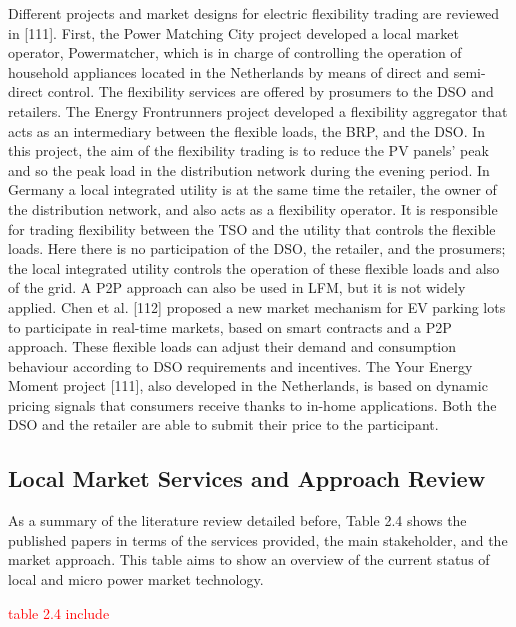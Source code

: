 Different projects and market designs for electric flexibility trading are reviewed in [111]. First, the Power Matching City project developed a local market operator, Powermatcher, which is in charge of controlling the operation of household appliances located in the Netherlands by means of direct and semi-direct control. 
The flexibility services are offered by prosumers to the DSO and retailers. The Energy Frontrunners project developed a flexibility aggregator that acts as an intermediary between the flexible loads, the BRP, and the DSO. In this project, the aim of the flexibility trading is to reduce the PV panels' peak and so the peak load in the distribution network during the evening period. In Germany a local integrated utility is at the same time the retailer, the owner of the distribution network, and also acts as a flexibility operator. It is responsible for trading flexibility between the TSO and the utility that controls the flexible loads. Here there is no participation of the DSO, the retailer, and the prosumers; the local integrated utility controls the operation of these flexible
loads and also of the grid.
A P2P approach can also be used in LFM, but it is not widely applied. Chen et al. [112] proposed a new market mechanism for EV parking lots to participate in real-time markets, based on smart contracts and a P2P approach. These flexible loads can adjust their demand and consumption behaviour according to DSO requirements and incentives. The Your Energy Moment project [111], also developed in the Netherlands, is based on dynamic pricing signals that consumers receive thanks to in-home applications. Both the DSO and
the retailer are able to submit their price to the participant.

\subsection{Local Market Services and Approach Review}
As a summary of the literature review detailed before, Table 2.4 shows the published papers in terms of the services provided, the main stakeholder, and the market approach. This table aims to show an overview of the current status of local and micro power market technology.

\textcolor{red}{table 2.4 include}

